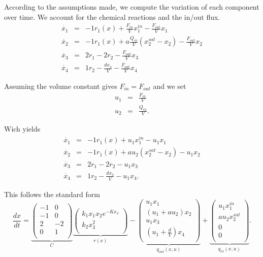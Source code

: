 According to the assumptions made, we compute the variation of each component over time. We account for the chemical reactions and the in/out flux.
$$\begin{array}{ccl}
\dot{x_{1}} & = & -1r_{1}(x)+\frac{F_{in}}{V}x_{1}^{in}-\frac{F_{out}}{V}x_{1}\\
\dot{x_{2}} & = & -1r_{1}(x)+a\frac{Q_{in}}{V}(x_{2}^{sat}-x_{2}) -\frac{F_{out}}{V}x_{2}\\
\dot{x_{3}} & = & 2r_{1}-2r_{2}-\frac{F_{out}}{V}x_{3}\\
\dot{x_{4}} & = & 1r_{2}-\frac{dx_{4}}{V}-\frac{F_{out}}{V}x_{4}
\end{array}$$

Assuming the volume constant gives $F_{in}=F_{out}$ and we set
$$\begin{array}{ccl}
u_{1} & = & \frac{F_{in}}{V}\\
u_{2} & = & \frac{Q_{in}}{V}.
\end{array}$$

Wich yields
$$\begin{array}{ccl}
\dot{x_{1}} & = & -1r_{1}(x)+u_{1}x_{1}^{in}-u_{1}x_{1}\\
\dot{x_{2}} & = & -1r_{1}(x)+au_{2}(x_{2}^{sat}-x_{2}) -u_{1}x_{2}\\
\dot{x_{3}} & = & 2r_{1}-2r_{2}-u_{1}x_{3}\\
\dot{x_{4}} & = & 1r_{2}-\frac{dx_{4}}{V}-u_{1}x_{4}.
\end{array}$$

This follows the standard form 
$$
\frac{dx}{dt}=
\underbrace{
\begin{pmatrix}
-1 & 0 \\
-1 & 0 \\
2 & -2 \\
0 & 1 \\
\end{pmatrix}}_{C} \underbrace{\begin{pmatrix}
k_{1}x_{1}x_{2}e^{-Kx_{4}}\\
k_{2}x_{3}^{2}\\
\end{pmatrix}}_{r(x)}-\underbrace{\begin{pmatrix}
u_{1}x_{1}\\
(u_{1}+au_{2})x_{2}\\
u_{1}x_{3}\\
(u_{1}+\frac{d}{V})x_{4}\\
\end{pmatrix}}_{q_{out}(x,u)}+
\underbrace{\begin{pmatrix}
u_{1}x_{1}^{in}\\
au_{2}x_{2}^{sat}\\
0\\
0\\
\end{pmatrix}}_{q_{in}(x,u)}.
$$




